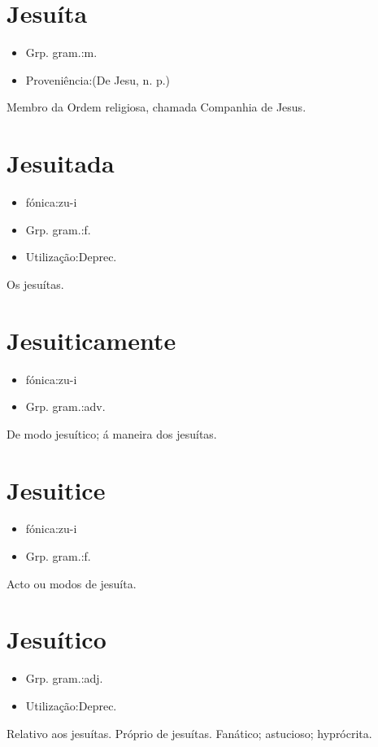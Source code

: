 \documentclass{article}
\begin{document}
\section{Jesuíta}
\begin{itemize}
\item {Grp. gram.:m.}
\end{itemize}
\begin{itemize}
\item {Proveniência:(De \textunderscore Jesu\textunderscore , n. p.)}
\end{itemize}
Membro da Ordem religiosa, chamada Companhia de Jesus.
\section{Jesuitada}
\begin{itemize}
\item {fónica:zu-i}
\end{itemize}
\begin{itemize}
\item {Grp. gram.:f.}
\end{itemize}
\begin{itemize}
\item {Utilização:Deprec.}
\end{itemize}
Os jesuítas.
\section{Jesuiticamente}
\begin{itemize}
\item {fónica:zu-i}
\end{itemize}
\begin{itemize}
\item {Grp. gram.:adv.}
\end{itemize}
De modo jesuítico; á maneira dos jesuítas.
\section{Jesuitice}
\begin{itemize}
\item {fónica:zu-i}
\end{itemize}
\begin{itemize}
\item {Grp. gram.:f.}
\end{itemize}
Acto ou modos de jesuíta.
\section{Jesuítico}
\begin{itemize}
\item {Grp. gram.:adj.}
\end{itemize}
\begin{itemize}
\item {Utilização:Deprec.}
\end{itemize}
Relativo aos jesuítas.
Próprio de jesuítas.
Fanático; astucioso; hyprócrita.
\end{document}
